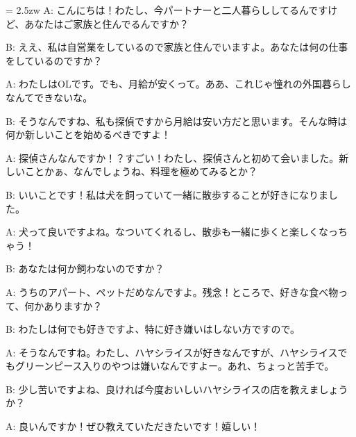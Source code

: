 \documentclass[11pt]{amsart}
\title{}
\author{}
\newenvironment{hangall}[1]{\hangindent = 2.5zw\everypar{\hangindent = 2.5zw}}{}
\begin{document}
\maketitle
\begin{hangall}{}%
A: こんにちは！わたし、今パートナーと二人暮らししてるんですけど、あなたはご家族と住んでるんですか？

B: ええ、私は自営業をしているので家族と住んでいますよ。あなたは何の仕事をしているのですか？

A: わたしはOLです。でも、月給が安くって。ああ、これじゃ憧れの外国暮らしなんてできないな。

B: そうなんですね、私も探偵ですから月給は安い方だと思います。そんな時は何か新しいことを始めるべきですよ！

A: 探偵さんなんですか！？すごい！わたし、探偵さんと初めて会いました。新しいことかぁ、なんでしょうね、料理を極めてみるとか？

B: いいことです！私は犬を飼っていて一緒に散歩することが好きになりました。

A: 犬って良いですよね。なついてくれるし、散歩も一緒に歩くと楽しくなっちゃう！

B: あなたは何か飼わないのですか？

A: うちのアパート、ペットだめなんですよ。残念！ところで、好きな食べ物って、何かありますか？

B: わたしは何でも好きですよ、特に好き嫌いはしない方ですので。

A: そうなんですね。わたし、ハヤシライスが好きなんですが、ハヤシライスでもグリーンピース入りのやつは嫌いなんですよー。あれ、ちょっと苦手で。

B: 少し苦いですよね、良ければ今度おいしいハヤシライスの店を教えましょうか？

A: 良いんですか！ぜひ教えていただきたいです！嬉しい！
\end{hangall}
\end{document}
